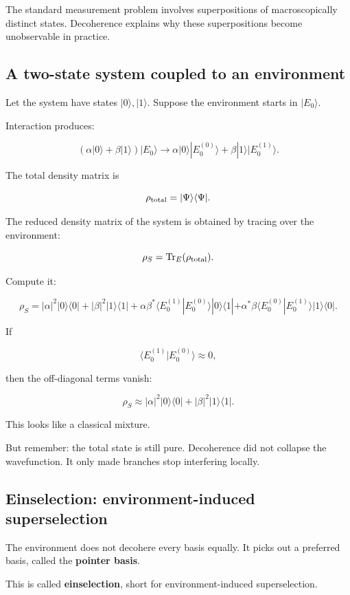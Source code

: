 \documentclass[11pt,a4paper]{article}
\begin{document}
The standard measurement problem involves superpositions of macroscopically distinct states. Decoherence explains why these superpositions become unobservable in practice.

\subsection{A two-state system coupled to an environment}

Let the system have states $|0\rangle, |1\rangle$. Suppose the environment starts in $|E_0\rangle$.

Interaction produces:

\[
(\alpha|0\rangle+\beta|1\rangle)|E_0\rangle
\longrightarrow
\alpha|0\rangle|E_0^{(0)}\rangle
+
\beta|1\rangle|E_0^{(1)}\rangle.
\]

The total density matrix is

\[
\rho_{\rm total}
=
|\Psi\rangle\langle\Psi|.
\]

The reduced density matrix of the system is obtained by tracing over the environment:

\[
\rho_S = \mathrm{Tr}_E(\rho_{\rm total}).
\]

Compute it:

\[
\rho_S
=
|\alpha|^2 |0\rangle\langle 0|
+
|\beta|^2 |1\rangle\langle 1|
+
\alpha\beta^* \langle E_0^{(1)}|E_0^{(0)}\rangle |0\rangle\langle 1|
+
\alpha^*\beta \langle E_0^{(0)}|E_0^{(1)}\rangle |1\rangle\langle 0|.
\]

If

\[
\langle E_0^{(1)}|E_0^{(0)}\rangle \approx 0,
\]

then the off-diagonal terms vanish:

\[
\rho_S \approx
|\alpha|^2 |0\rangle\langle 0|
+
|\beta|^2 |1\rangle\langle 1|.
\]

This looks like a classical mixture.

But remember: the total state is still pure. Decoherence did not collapse the wavefunction. It only made branches stop interfering locally.

\subsection{Einselection: environment-induced superselection}

The environment does not decohere every basis equally. It picks out a preferred basis, called the \textbf{pointer basis}.

This is called \textbf{einselection}, short for environment-induced superselection.
\end{document}
